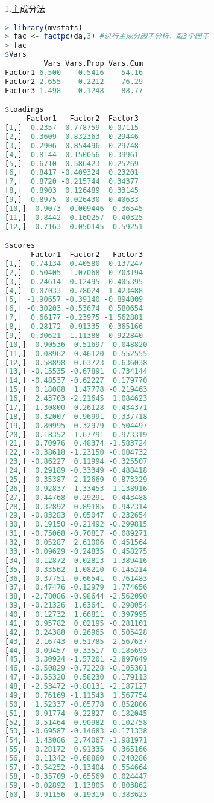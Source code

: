 \documentclass[11pt,a4paper,oneside]{book}
\begin{document}
1.主成分法
\begin{lstlisting}[language=r]
> library(mvstats)
> fac <- factpc(da,3) #进行主成分因子分析，取3个因子
> fac
$Vars
         Vars Vars.Prop Vars.Cum
Factor1 6.500    0.5416    54.16
Factor2 2.655    0.2212    76.29
Factor3 1.498    0.1248    88.77

$loadings
     Factor1   Factor2  Factor3
[1,]  0.2357  0.778759 -0.07115
[2,]  0.3609  0.832363  0.29446
[3,]  0.2906  0.854496  0.29748
[4,]  0.8144 -0.150056  0.39961
[5,]  0.6710 -0.586423  0.25269
[6,]  0.8417 -0.409324  0.23201
[7,]  0.8720 -0.215744  0.34377
[8,]  0.8903  0.126489  0.33145
[9,]  0.8975  0.026430 -0.40633
[10,]  0.9073  0.009446 -0.36545
[11,]  0.8442  0.160257 -0.40325
[12,]  0.7163  0.050145 -0.59251

$scores
      Factor1  Factor2   Factor3
[1,] -0.74134  0.40580  0.137247
[2,]  0.50405 -1.07068  0.703194
[3,]  0.24614  0.12495  0.405395
[4,] -0.07033  0.78024  1.423488
[5,] -1.90657 -0.39140 -0.894009
[6,] -0.30203 -0.53674  0.580654
[7,]  0.66177 -0.23975 -1.562881
[8,]  0.28172  0.91335  0.365166
[9,]  0.30621 -1.11388  0.922840
[10,] -0.90536 -0.51697  0.048820
[11,] -0.08962 -0.46120  0.552555
[12,]  0.58898 -0.63723  0.636038
[13,] -0.15535 -0.67891  0.734144
[14,] -0.48537 -0.62227  0.179770
[15,]  0.18088  1.47778 -0.219463
[16,]  2.43703 -2.21645  1.084623
[17,] -1.30800 -0.26128 -0.434371
[18,] -0.32007  0.96991  0.337718
[19,] -0.80995  0.32979  0.504497
[20,] -0.18352 -1.67791  0.973319
[21,]  0.70976  0.48374 -1.583724
[22,] -0.38618 -1.23150 -0.004732
[23,] -0.86227  0.11994 -0.325507
[24,]  0.29189 -0.33349 -0.488418
[25,]  0.35387  2.12669  0.873329
[26,]  0.92837  1.33453 -1.138916
[27,]  0.44768 -0.29291 -0.443488
[28,] -0.32892  0.89185 -0.942314
[29,] -0.83283  0.05047  0.232654
[30,]  0.19150 -0.21492 -0.299815
[31,] -0.75068 -0.70817 -0.089271
[32,]  0.05287  2.61006  0.451564
[33,] -0.09629 -0.24835  0.458275
[34,] -0.12872 -0.02813  1.389416
[35,]  0.33562  1.08210  0.145214
[36,]  0.37751 -0.66541  0.761483
[37,]  0.47476 -0.12979  1.774656
[38,] -2.78086 -0.98644 -2.562090
[39,] -0.21326  1.63641  0.298054
[40,]  0.12732  1.66811  0.397995
[41,]  0.95782  0.02195 -0.281101
[42,]  0.24388  0.26965  0.505428
[43,]  2.16743 -0.51785 -2.567637
[44,] -0.09457  0.33517 -0.185693
[45,]  3.30924 -1.57201 -2.897649
[46,] -0.50829 -0.72228 -0.105301
[47,] -0.55320  0.58230  0.179113
[48,] -2.53472 -0.80131 -2.187127
[49,]  0.76169 -1.11543  1.567754
[50,]  1.52337 -0.05778  0.852806
[51,] -0.91774 -0.22827  0.182045
[52,]  0.51464 -0.90982  0.102758
[53,] -0.69587 -0.14683 -0.171338
[54,]  1.43086  2.74067 -1.981971
[55,]  0.28172  0.91335  0.365166
[56,]  0.11342 -0.68860  0.240286
[57,] -0.54252 -0.13404  0.554664
[58,] -0.35709 -0.65569  0.024447
[59,] -0.02892  1.13805  0.803862
[60,] -0.91156 -0.19319 -0.383623


\end{lstlisting}
\end{document}
